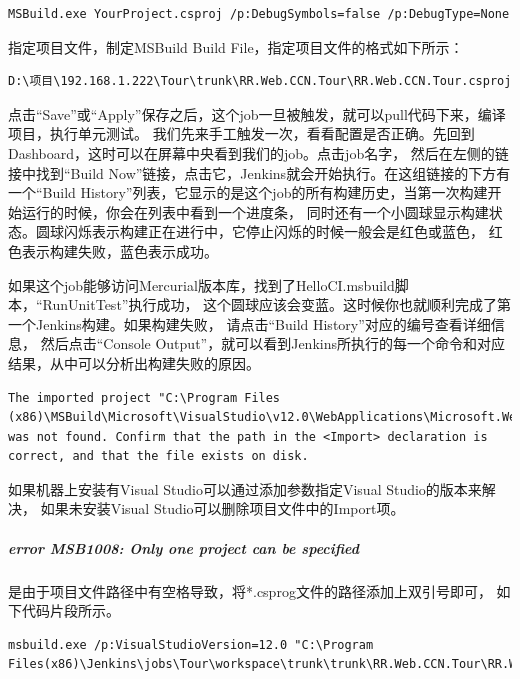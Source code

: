 \documentclass{book}
\begin{document}
\begin{lstlisting}[language=Bash]
MSBuild.exe YourProject.csproj /p:DebugSymbols=false /p:DebugType=None
\end{lstlisting}

指定项目文件，制定MSBuild Build File，指定项目文件的格式如下所示：

\begin{lstlisting}
D:\项目\192.168.1.222\Tour\trunk\RR.Web.CCN.Tour\RR.Web.CCN.Tour.csproj
\end{lstlisting}

点击“Save”或“Apply”保存之后，这个job一旦被触发，就可以pull代码下来，编译项目，执行单元测试。
我们先来手工触发一次，看看配置是否正确。先回到Dashboard，这时可以在屏幕中央看到我们的job。点击job名字，
然后在左侧的链接中找到“Build Now”链接，点击它，Jenkins就会开始执行。在这组链接的下方有一个“Build History”列表，它显示的是这个job的所有构建历史，当第一次构建开始运行的时候，你会在列表中看到一个进度条，
同时还有一个小圆球显示构建状态。圆球闪烁表示构建正在进行中，它停止闪烁的时候一般会是红色或蓝色，
红色表示构建失败，蓝色表示成功。

如果这个job能够访问Mercurial版本库，找到了HelloCI.msbuild脚本，“RunUnitTest”执行成功，
这个圆球应该会变蓝。这时候你也就顺利完成了第一个Jenkins构建。如果构建失败，
请点击“Build History”对应的编号查看详细信息，
然后点击“Console Output”，就可以看到Jenkins所执行的每一个命令和对应结果，从中可以分析出构建失败的原因。

\begin{lstlisting}
The imported project "C:\Program Files (x86)\MSBuild\Microsoft\VisualStudio\v12.0\WebApplications\Microsoft.WebApplication.targets" was not found. Confirm that the path in the <Import> declaration is correct, and that the file exists on disk.
\end{lstlisting}

如果机器上安装有Visual Studio可以通过添加参数指定Visual Studio的版本来解决，
如果未安装Visual Studio可以删除项目文件中的Import项。

\subparagraph{error MSB1008: Only one project can be specified}

是由于项目文件路径中有空格导致，将*.csprog文件的路径添加上双引号即可，
如下代码片段所示。

\begin{lstlisting}
msbuild.exe /p:VisualStudioVersion=12.0 "C:\Program Files(x86)\Jenkins\jobs\Tour\workspace\trunk\trunk\RR.Web.CCN.Tour\RR.Web.CCN.Tour.csproj"
\end{lstlisting}
\end{document}
